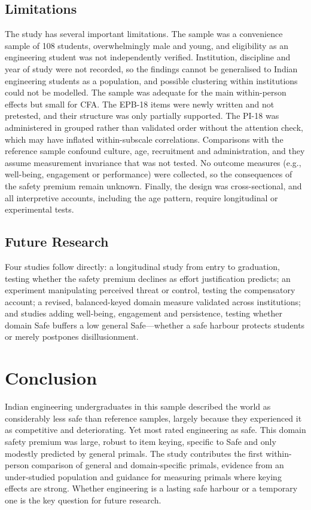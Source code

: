 \documentclass[journal,a4paper]{IEEEtran}
\begin{document}
\subsection{Limitations}

The study has several important limitations. The sample was a convenience sample of 108 students, overwhelmingly male and young, and eligibility as an engineering student was not independently verified. Institution, discipline and year of study were not recorded, so the findings cannot be generalised to Indian engineering students as a population, and possible clustering within institutions could not be modelled. The sample was adequate for the main within-person effects but small for CFA. The EPB-18 items were newly written and not pretested, and their structure was only partially supported. The PI-18 was administered in grouped rather than validated order without the attention check, which may have inflated within-subscale correlations. Comparisons with the reference sample confound culture, age, recruitment and administration, and they assume measurement invariance that was not tested. No outcome measures (e.g., well-being, engagement or performance) were collected, so the consequences of the safety premium remain unknown. Finally, the design was cross-sectional, and all interpretive accounts, including the age pattern, require longitudinal or experimental tests.

\subsection{Future Research}

Four studies follow directly: a longitudinal study from entry to graduation, testing whether the safety premium declines as effort justification predicts; an experiment manipulating perceived threat or control, testing the compensatory account; a revised, balanced-keyed domain measure validated across institutions; and studies adding well-being, engagement and persistence, testing whether domain Safe buffers a low general Safe—whether a safe harbour protects students or merely postpones disillusionment.

\section{Conclusion}

Indian engineering undergraduates in this sample described the world as considerably less safe than reference samples, largely because they experienced it as competitive and deteriorating. Yet most rated engineering as safe. This domain safety premium was large, robust to item keying, specific to Safe and only modestly predicted by general primals. The study contributes the first within-person comparison of general and domain-specific primals, evidence from an under-studied population and guidance for measuring primals where keying effects are strong. Whether engineering is a lasting safe harbour or a temporary one is the key question for future research.
\end{document}
